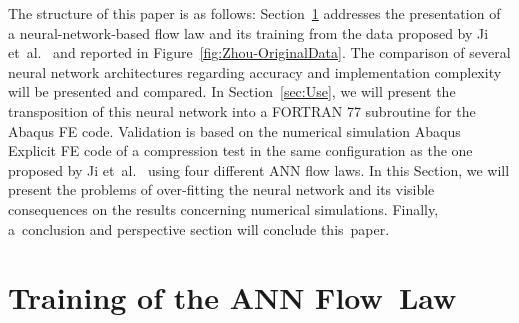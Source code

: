 \documentclass[algorithms,article,accept,pdftex,oneauthors]{Definitions/mdpi}
\begin{document}
The structure of this paper is as follows:
Section~\ref{sec:Training} addresses the presentation of a neural-network-based flow law and its training from the data proposed by Ji et~al.~\cite{Ji-2018} and reported in Figure~\ref{fig:Zhou-OriginalData}.
The comparison of several neural network architectures regarding accuracy and implementation complexity will be presented and compared.
In Section~\ref{sec:Use}, we will present the transposition of this neural network into a FORTRAN 77 subroutine for the Abaqus FE code.
Validation is based on the numerical simulation Abaqus Explicit FE code of a compression test in the same configuration as the one proposed by Ji et~al.~\cite{Ji-2018} using four different ANN flow laws.
In this Section, we will present the problems of over-fitting the neural network and its visible consequences on the results concerning numerical simulations.
Finally, a~conclusion and perspective section will conclude this~paper.

\section{Training of the ANN Flow~Law}\label{sec:Training}
\end{document}
